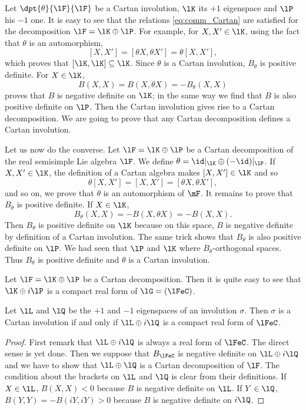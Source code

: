 Let $\dpt{\theta}{\lF}{\lF}$ be a Cartan involution, $\lK$ its $+1$ eigenspace and $\lP$ his $-1$ one. It is easy to see that the relations \eqref{eq:comm_Cartan} are satisfied for the decomposition  $\lF=\lK\oplus\lP$. For example, for $X,X'\in\lK$, using the fact that $\theta$ is an automorphism, 
\[
   [X,X']=[\theta X,\theta X']=\theta[X,X'],
\]
which proves that $[\lK,\lK]\subseteq\lK$. Since $\theta$ is a Cartan involution, $B_{\theta}$ is positive definite. For $X\in\lK$,
\[
  B(X,X)=B(X,\theta X)=-B_{\theta}(X,X)
\]
proves that $B$ is negative definite on $\lK$; in the same way we find that $B$ is also positive definite on $\lP$. Then the Cartan involution gives rise to a Cartan decomposition. We are going to prove that any Cartan decomposition defines a Cartan involution.

Let us now do the converse. Let $\lF=\lK\oplus\lP$ be a Cartan decomposition of the real semisimple Lie algebra $\lF$. We define $\theta=\id|_{\lK}\oplus(-\id)|_{\lP}$. If $X,X'\in\lK$, the definition of a Cartan algebra makes $[X,X']\in\lK$ and so
\[
  \theta[X,X']=[X,X']=[\theta X,\theta X'],
\]
and so on, we prove that $\theta$ is an automorphism of $\mF$. It remains to prove that $B_{\theta}$ is positive definite. If $X\in\lK$,
\[
   B_{\theta}(X,X)=-B(X,\theta X)=-B(X,X).
\]
Then $B_{\theta}$ is positive definite on $\lK$ because on this space, $B$ is negative definite by definition of a Cartan involution. The same trick shows that $B_{\theta}$ is also positive definite on $\lP$. We had seen that $\lP$ and $\lK$ where $B_{\theta}$-orthogonal spaces. Thus $B_{\theta}$ is positive definite and $\theta$ is a Cartan involution.

Let $\lF=\lK\oplus\lP$ be a Cartan decomposition. Then it is quite easy to see that $\lK\oplus i\lP$ is a compact real form of $\lG=(\lFeC)$.

\begin{proposition}
Let $\lL$ and $\lQ$ be the $+1$ and $-1$ eigenspaces of an involution $\sigma$. Then $\sigma$ is a Cartan involution if and only if $\lL\oplus i\lQ$ is  a compact real form of $\lFeC$.
\end{proposition}

\begin{proof}
First remark that $\lL\oplus i\lQ$ is always a real form of $\lFeC$. The direct sense is yet done. Then we suppose that $B_{\lFeC}$ is negative definite on $\lL\oplus i\lQ$ and we have to show that $\lL\oplus\lQ$ is a Cartan decomposition of $\lF$. The condition about the brackets on $\lL$ and $\lQ$ is clear from their definitions. If $X\in\lL$, $B(X,X)<0$ because $B$ is negative definite on $\lL$. If $Y\in\lQ$, $B(Y,Y)=-B(iY,iY)>0$ because $B$ is negative definite on $i\lQ$.
\end{proof}

